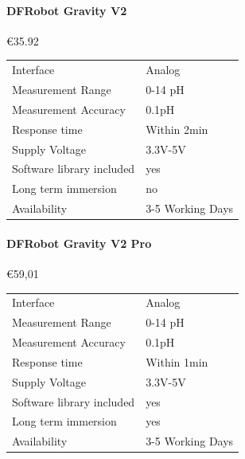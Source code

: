 \paragraph{DFRobot Gravity V2}\mbox{€35.92} \cite{SEN0161V2}
\begin{table}[h!]
	\centering
	\quad
	\begin{tabular}{| l | l |}
    \hline
    Interface & Analog \\
    Measurement Range & 0-14 pH \\
    Measurement Accuracy &  0.1pH \\
    Response time & Within 2min \\
    Supply Voltage & 3.3V-5V \\
    Software library included & yes \\
    Long term immersion & no \\
    Availability & 3-5 Working Days \\
    \hline
	\end{tabular}
\end{table}

\newpage
\paragraph{DFRobot Gravity V2 Pro}\mbox{€59,01} \cite{SEN0169V2}
\begin{table}[h!]
	\centering
	\quad
	\begin{tabular}{| l | l |}
    \hline
    Interface & Analog \\
    Measurement Range & 0-14 pH \\
    Measurement Accuracy &  0.1pH \\
    Response time & Within 1min \\
    Supply Voltage & 3.3V-5V \\
    Software library included & yes \\
    Long term immersion & yes \\
    Availability & 3-5 Working Days \\
    \hline
	\end{tabular}
\end{table}


